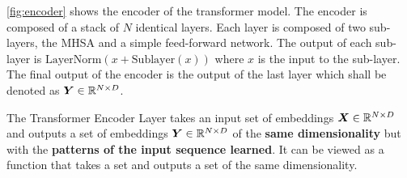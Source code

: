 \documentclass[../../main.tex]{subfiles}
\begin{document}
\autoref{fig:encoder} shows the encoder of the transformer model. The encoder is composed of a stack of $N$ identical layers. Each layer is composed of two sub-layers, the MHSA and a simple feed-forward network. The output of each sub-layer is $\text{LayerNorm}(x + \text{Sublayer}(x))$ where $x$ is the input to the sub-layer.  The final output of the encoder is the output of the last layer which shall be denoted as $\bm{Y} \in \mathbb{R}^{N \times D}$. 

\begin{note}

The Transformer Encoder Layer takes an input set of embeddings $\bm{X} \in \mathbb{R}^{N \times D}$ and outputs a set of embeddings $\bm{Y} \in \mathbb{R}^{N \times D}$ of the \textbf{same dimensionality} but with the \textbf{patterns of the input sequence learned}. It can be viewed as a function that takes a set and outputs a set of the same dimensionality.

\end{note}

\ifSubfilesClassLoaded{%
    \printbibliography{}
}{} 
\end{document}
